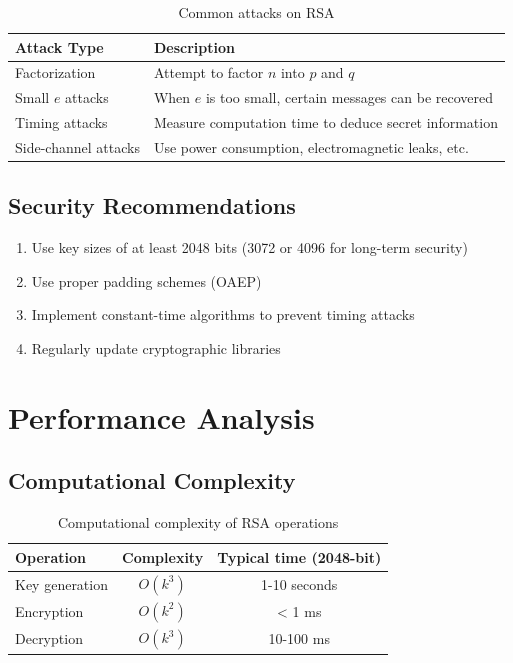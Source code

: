 	\begin{table}[htbp]
		\centering
		\begin{tabular}{lp{8cm}}
			\toprule
			\textbf{Attack Type} & \textbf{Description} \\
			\midrule
			Factorization & Attempt to factor $n$ into $p$ and $q$ \\
			Small $e$ attacks & When $e$ is too small, certain messages can be recovered \\
			Timing attacks & Measure computation time to deduce secret information \\
			Side-channel attacks & Use power consumption, electromagnetic leaks, etc. \\
			\bottomrule
		\end{tabular}
		\caption{Common attacks on RSA}
	\end{table}
	
	\subsection{Security Recommendations}
	
	\begin{enumerate}
		\item Use key sizes of at least 2048 bits (3072 or 4096 for long-term security)
		\item Use proper padding schemes (OAEP)
		\item Implement constant-time algorithms to prevent timing attacks
		\item Regularly update cryptographic libraries
	\end{enumerate}
	
	\section{Performance Analysis}
	
	\subsection{Computational Complexity}
	
	\begin{table}[htbp]
		\centering
		\begin{tabular}{lcc}
			\toprule
			\textbf{Operation} & \textbf{Complexity} & \textbf{Typical time (2048-bit)} \\
			\midrule
			Key generation & $O(k^3)$ & 1-10 seconds \\
			Encryption & $O(k^2)$ & < 1 ms \\
			Decryption & $O(k^3)$ & 10-100 ms \\
			\bottomrule
		\end{tabular}
		\caption{Computational complexity of RSA operations}
	\end{table}
	
